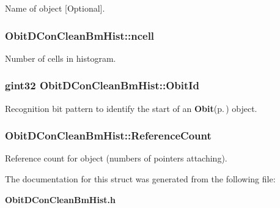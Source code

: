 Name of object [Optional]. 

\subsubsection{ {\bf Obit\-DCon\-Clean\-Bm\-Hist::ncell}}\label{structObitDConCleanBmHist_o4}


Number of cells in histogram. 

\subsubsection{\setlength{\rightskip}{0pt plus 5cm}gint32 {\bf Obit\-DCon\-Clean\-Bm\-Hist::Obit\-Id}}\label{structObitDConCleanBmHist_o0}


Recognition bit pattern to identify the start of an {\bf Obit}{\rm (p.\,\pageref{structObit})} object. 

\subsubsection{ {\bf Obit\-DCon\-Clean\-Bm\-Hist::Reference\-Count}}\label{structObitDConCleanBmHist_o2}


Reference count for object (numbers of pointers attaching). 



The documentation for this struct was generated from the following file:\begin{CompactItemize}
\item 
{\bf Obit\-DCon\-Clean\-Bm\-Hist.h}\end{CompactItemize}
